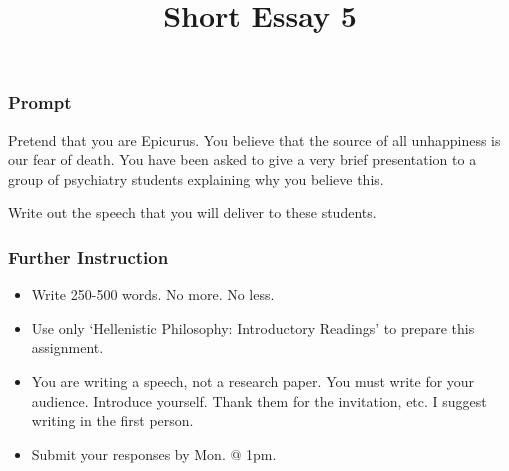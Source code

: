 \documentclass[]{article}
\title{Short Essay 5}
\date{}
\begin{document}
\maketitle

\subsubsection{Prompt}\label{prompt}

Pretend that you are Epicurus. You believe that the source of all
unhappiness is our fear of death. You have been asked to give a very
brief presentation to a group of psychiatry students explaining why you
believe this.

Write out the speech that you will deliver to these students.

\subsubsection{Further Instruction}\label{further-instruction}

\begin{itemize}
\itemsep1pt\parskip0pt
\item
  Write 250-500 words. No more. No less.
\item
  Use only `Hellenistic Philosophy: Introductory Readings' to prepare
  this assignment.
\item
  You are writing a speech, not a research paper. You must write for
  your audience. Introduce yourself. Thank them for the invitation, etc.
  I suggest writing in the first person.
\item
  Submit your responses by Mon. @ 1pm.
\end{itemize}
\end{document}
